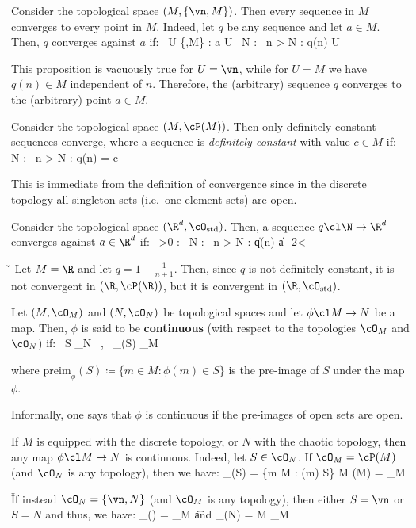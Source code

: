 Consider the topological space $(M,\{\vn,M\})$. Then every sequence in $M$ converges to every point in $M$. Indeed,
let $q$ be any sequence and let $a \in M$. Then, $q$ converges against $a$ if:
\bse
\forall \, U \in \{\vn,M\} : a \in U \imp \exists \, N \in \N : \forall \, n > N : q(n) \in U
\ese

This proposition is vacuously true for $U=\vn$, while for $U=M$ we have $q (n)\in M$ independent of $n$. Therefore,
the (arbitrary) sequence $q$ converges to the (arbitrary) point $a\in M$.
\ee

\be
Consider the topological space $(M,\cP(M))$. Then only definitely constant sequences converge, where a sequence is
\emph{definitely constant} with value $c\in M$ if:
\bse
\exists \, N \in \N : \forall \, n > N : q(n) = c
\ese

This is immediate from the definition of convergence since in the discrete topology all singleton sets (i.e.\
one-element sets) are open.
\ee

\be
Consider the topological space $(\R^d,\cO_\mathrm{std})$. Then, a sequence $q\cl \N \to \R^d$ converges against $a\in
\R^d$ if:
\bse
\forall\, \ve >0 : \exists \, N \in \N : \forall \, n > N : \|q(n)-a\|_2<\ve
\ese
\ee

\v

\be
Let $M=\R$ and let $q=1-\frac{1}{n+1}$. Then, since $q$ is not definitely constant, it is not convergent in $(\R,\cP
(\R))$, but it is convergent in $(\R,\cO_\mathrm{std})$.
\ee

\bd [Continuity]
Let $(M,\cO_M)$ and $(N,\cO_N)$ be topological spaces and let $\phi\cl M\to N$ be a map. Then, $\phi$ is said to be
\textbf{continuous} (with respect to the topologies $\cO_M$ and $\cO_N$) if:
\bse
\forall \, S \in \cO_N \, , \ _\phi(S) \in \cO_M
\ese

where $\mathrm{preim}_\phi(S) \coloneqq \{m \in M : \phi(m) \in S\}$ is the pre-image of $S$ under the map $\phi$.
\ed

Informally, one says that $\phi$ is continuous if the pre-images of open sets are open.

\be
If $M$ is equipped with the discrete topology, or $N$ with the chaotic topology, then any map $\phi\cl M \to N$ is
continuous. Indeed, let $S \in \cO_N$. If $\cO_M=\cP(M)$ (and $\cO_N$ is any topology), then we have:
\bse
{}_\phi(S) = \{m \in M : \phi(m) \in S\} \se M \in \cP(M) = \cO_M
\ese

\v

If instead $\cO_N=\{\vn,N\}$ (and $\cO_M$ is any topology), then either $S=\vn$ or $S=N$ and thus, we have:
\bse
{}_\phi(\vn) = \vn \in \cO_M \quad \t{and} \quad {}_\phi(N) = M \in \cO_M
\ese
\ee

